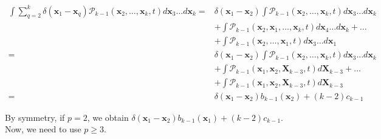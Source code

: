 \begin{subequations} 
\begin{flalign}
\int \sum_{q=2}^{k}\delta({\boldsymbol{x}_1-\boldsymbol{x}_q})\mathcal{P}_{k-1}(\boldsymbol{x}_{2},\ldots,\boldsymbol{x}_{k},t) d\boldsymbol{x}_{3}\ldots d\boldsymbol{x}_{k} = & \delta(\boldsymbol{x}_{1}-\boldsymbol{x}_{2})\int\mathcal{P}_{k-1}(\boldsymbol{x}_{2},\ldots,\boldsymbol{x}_{k},t)d\boldsymbol{x}_{3}\ldots d\boldsymbol{x}_{k}\\
&+ \int\mathcal{P}_{k-1}(\boldsymbol{x}_{2},\boldsymbol{x}_{1},\ldots,\boldsymbol{x}_{k},t)d\boldsymbol{x}_{4}\ldots d\boldsymbol{x}_{k} + \ldots \\
& +\int\mathcal{P}_{k-1}(\boldsymbol{x}_{2},\ldots,\boldsymbol{x}_{1},t)d\boldsymbol{x}_{3}\ldots d\boldsymbol{x}_{1}\\
=&\delta(\boldsymbol{x}_{1}-\boldsymbol{x}_{2})\int\mathcal{P}_{k-1}(\boldsymbol{x}_{2},\ldots,\boldsymbol{x}_{k},t)d\boldsymbol{x}_{3}\ldots d\boldsymbol{x}_{k}\\
 & +\int\mathcal{P}_{k-1}(\boldsymbol{x}_{1},\boldsymbol{x}_{2},\boldsymbol{X}_{k-3},t)d\boldsymbol{X}_{k-3}+\ldots\\
 & +\int\mathcal{P}_{k-1}(\boldsymbol{x}_{1},\boldsymbol{x}_{2},\boldsymbol{X}_{k-3},t)d\boldsymbol{X}_{k-3}\\
= & \delta(\boldsymbol{x}_{1}-\boldsymbol{x}_{2})b_{k-1}(\boldsymbol{x}_{2})+(k-2)c_{k-1}
\end{flalign}
\end{subequations}

By symmetry, if $p=2$, we obtain $\delta(\boldsymbol{x}_{1}-\boldsymbol{x}_{2})b_{k-1}(\boldsymbol{x}_{1})+(k-2)c_{k-1}$.\\

Now, we need to use $p\geq3$.

